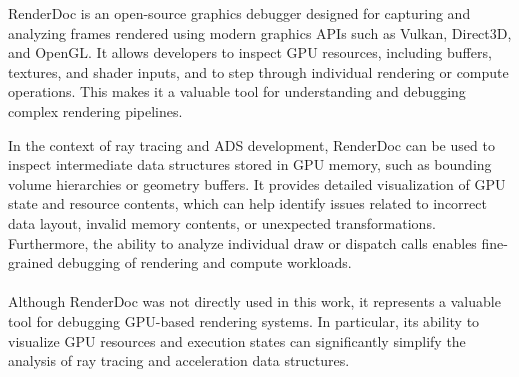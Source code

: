 RenderDoc is an open-source graphics debugger designed for capturing and analyzing frames rendered using modern graphics APIs such as Vulkan, Direct3D, and OpenGL. It allows developers to inspect GPU resources, including buffers, textures, and shader inputs, and to step through individual rendering or compute operations. This makes it a valuable tool for understanding and debugging complex rendering pipelines. \cite{renderdoc}

In the context of ray tracing and ADS development, RenderDoc can be used to inspect intermediate data structures stored in GPU memory, such as bounding volume hierarchies or geometry buffers. It provides detailed visualization of GPU state and resource contents, which can help identify issues related to incorrect data layout, invalid memory contents, or unexpected transformations. Furthermore, the ability to analyze individual draw or dispatch calls enables fine-grained debugging of rendering and compute workloads. \cite{renderdoc}

\paragraph{}
Although RenderDoc was not directly used in this work, it represents a valuable tool for debugging GPU-based rendering systems. In particular, its ability to visualize GPU resources and execution states can significantly simplify the analysis of ray tracing and acceleration data structures.
